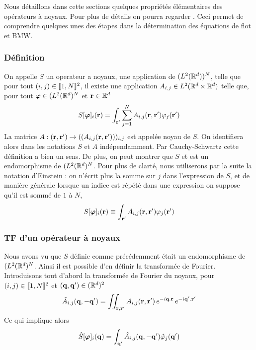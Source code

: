 \documentclass[10pt]{article}
\begin{document}
\begin{multicols}{2}
Nous détaillons dans cette sections quelques propriétés élémentaires des opérateurs à noyaux. Pour plus de détails on pourra regarder \cite{}. Ceci permet de comprendre quelques unes des étapes dans la détermination des équations de flot et BMW. \\



\subsubsection{Définition}

On appelle $S$ un operateur a noyaux, une application de $(L^2(\mathbb{R}^d))^N$, telle que pour tout $(i,j) \in  \llbracket 1,N \rrbracket ^2$, il existe une application $A_{i,j} \in L^2(\mathbb{R}^d\times\mathbb{R}^d)$ telle que,  pour tout $\boldsymbol{ \varphi} \in (L^2(\mathbb{R}^d)^N$ et ${\bf r} \in \mathbb{R}^d$
 \begin{equation}
  S[\boldsymbol{ \varphi}]_i({\bf r}) = \int_{{\bf r}'} \sum_{j=1}^{N} A_{i,j}({\bf r},{\bf r}')\varphi_j({\bf r}')
 \end{equation}
 La matrice $A : ({\bf r},{\bf r}') \rightarrow ((A_{i,j}({\bf r},{\bf r}')))_{i,j}$ est appelée noyau de $S$.  On identifiera alors dans les notations $S$ et $A$ indépendamment. Par Cauchy-Schwartz cette définition a bien  un sens. De plus, on peut montrer que $S$ et est un endomorphisme de $(L^2(\mathbb{R}^d)^N$. Pour plus de clarté, nous utiliserons par la suite la notation d'Einstein : on n'écrit plus la somme sur $j$ dans l'expression de $S$, et de manière générale lorsque un indice est répété dans une expression on suppose qu'il est sommé de $1$ à $N$, 
  \begin{equation}
  S[\boldsymbol{ \varphi}]_i({\bf r}) \equiv \int_{{\bf r}'} A_{i,j}({\bf r},{\bf r}')\varphi_j({\bf r}')
 \end{equation}
 



\vspace*{11pt}

\subsubsection{TF d'un opérateur à noyaux}

Nous avons vu que $S$ définie comme précédemment était un endomorphisme de $(L^2(\mathbb{R}^d)^N$. Ainsi il est possible d'en définir la transformée de Fourier. Introduisons tout d'abord la transformée de Fourier du noyaux, pour $(i,j) \in  \llbracket 1,N \rrbracket ^2$ et $({\bf q}, {\bf q}') \in (\mathbb{R}^d)^2 $
\begin{equation}
	 \hat{A}_{i,j}({\bf q}, -{\bf q}') = \iint_{{\bf r},{\bf r}'} A_{i,j}({\bf r},{\bf r}')\,e^{-i{\bf q}.{\bf r}} \, e^{-i {\bf q}'.{\bf r}'} 
\end{equation}
Ce qui implique alors 
\begin{equation}
	 \hat{S}[\boldsymbol{ \varphi}]_i({\bf q}) = \int_{{\bf q}'} \hat{A}_{i,j}({\bf q}, -{\bf q}') \hat{\varphi}_j({\bf q}')
\end{equation}




\end{multicols}
\end{document}
